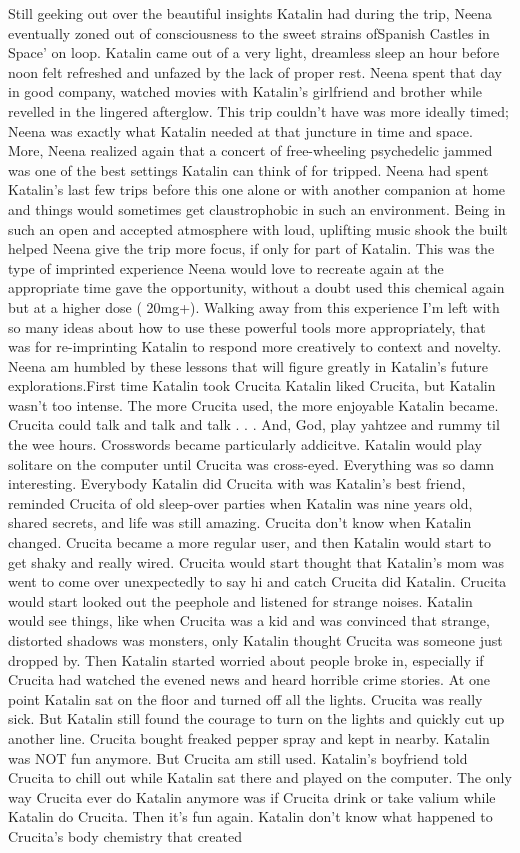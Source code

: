 \documentclass[12pt]{book}
\begin{document}
Still geeking out over the beautiful insights Katalin had during the trip, Neena eventually zoned out of consciousness to the sweet strains ofSpanish Castles in Space' on loop. Katalin came out of a very light, dreamless sleep an hour before noon felt refreshed and unfazed by the lack of proper rest. Neena spent that day in good company, watched movies with Katalin's girlfriend and brother while revelled in the lingered afterglow. This trip couldn't have was more ideally timed; Neena was exactly what Katalin needed at that juncture in time and space. More, Neena realized again that a concert of free-wheeling psychedelic jammed was one of the best settings Katalin can think of for tripped. Neena had spent Katalin's last few trips before this one alone or with another companion at home and things would sometimes get claustrophobic in such an environment. Being in such an open and accepted atmosphere with loud, uplifting music shook the built helped Neena give the trip more focus, if only for part of Katalin. This was the type of imprinted experience Neena would love to recreate again at the appropriate time gave the opportunity, without a doubt used this chemical again but at a higher dose ( 20mg+). Walking away from this experience I'm left with so many ideas about how to use these powerful tools more appropriately, that was for re-imprinting Katalin to respond more creatively to context and novelty. Neena am humbled by these lessons that will figure greatly in Katalin's future explorations.First time Katalin took Crucita Katalin liked Crucita, but Katalin wasn't too intense. The more Crucita used, the more enjoyable Katalin became. Crucita could talk and talk and talk . . .  And, God, play yahtzee and rummy til the wee hours. Crosswords became particularly addicitve. Katalin would play solitare on the computer until Crucita was cross-eyed. Everything was so damn interesting. Everybody Katalin did Crucita with was Katalin's best friend, reminded Crucita of old sleep-over parties when Katalin was nine years old, shared secrets, and life was still amazing. Crucita don't know when Katalin changed. Crucita became a more regular user, and then Katalin would start to get shaky and really wired. Crucita would start thought that Katalin's mom was went to come over unexpectedly to say hi and catch Crucita did Katalin. Crucita would start looked out the peephole and listened for strange noises. Katalin would see things, like when Crucita was a kid and was convinced that strange, distorted shadows was monsters, only Katalin thought Crucita was someone just dropped by. Then Katalin started worried about people broke in, especially if Crucita had watched the evened news and heard horrible crime stories. At one point Katalin sat on the floor and turned off all the lights. Crucita was really sick. But Katalin still found the courage to turn on the lights and quickly cut up another line. Crucita bought freaked pepper spray and kept in nearby. Katalin was NOT fun anymore. But Crucita am still used. Katalin's boyfriend told Crucita to chill out while Katalin sat there and played on the computer. The only way Crucita ever do Katalin anymore was if Crucita drink or take valium while Katalin do Crucita. Then it's fun again. Katalin don't know what happened to Crucita's body chemistry that created 
\end{document}
